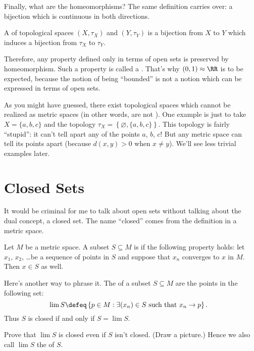 
Finally, what are the homeomorphisms?
The same definition carries over: a bijection which is continuous in both directions.
\begin{definition}
	A  of topological spaces $(X, \tau_X)$ and $(Y, \tau_Y)$
	is a bijection from $X$ to $Y$
	which induces a bijection from $\tau_X$ to $\tau_Y$.
\end{definition}
Therefore, any property defined only in terms of open sets is preserved by homeomorphism. Such a property is called a .
That's why $(0,1) \approx \RR$ is to be expected, because the notion of being ``bounded'' is not a notion which can be expressed in terms of open sets.

\begin{remark}
	As you might have guessed, there exist topological spaces which cannot be realized
	as metric spaces (in other words, are not ).
	One example is just to take $X = \{a,b,c\}$ and the topology $\tau_X = \left\{ \varnothing, \{a,b,c\} \right\}$.
	This topology is fairly ``stupid'': it can't tell apart any of the points $a$, $b$, $c$!
	But any metric space can tell its points apart (because $d(x,y) > 0$ when $x \neq y$).
	We'll see less trivial examples later.
\end{remark}


\section{Closed Sets}
It would be criminal for me to talk about open sets without talking about the dual concept, a closed set.
The name ``closed'' comes from the definition in a metric space.
\begin{definition}
	Let $M$ be a metric space.
	A subset $S \subseteq M$ is  if the following property holds:
	let $x_1$, $x_2$, \dots be a sequence of points in $S$
	and suppose that $x_n$ converges to $x$ in $M$.
	Then $x \in S$ as well.
\end{definition}
Here's another way to phrase it.
The  of a subset $S \subseteq M$ are the points
in the following set:
\[ \lim S \defeq \left\{ p \in M : \exists (x_n) \in S \text{ such that } x_n \to p \right\}. \]
Thus $S$ is closed if and only if $S = \lim S$.
\begin{exercise}
	Prove that $\lim S$ is closed even if $S$ isn't closed. (Draw a picture.)
	Hence we also call $\lim S$ the  of $S$.
\end{exercise}

